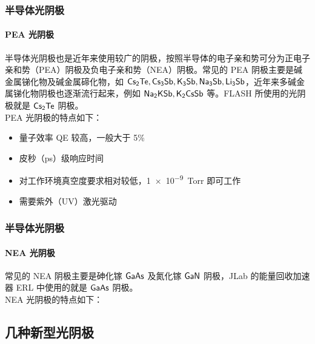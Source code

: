\documentclass[ignorenonframetext, t]{beamer}
\begin{document}
\begin{frame}[label=current]
	\frametitle{半导体光阴极}
	\framesubtitle{PEA 光阴极}
	半导体光阴极也是近年来使用较广的阴极，按照半导体的电子亲和势可分为正电子亲和势（PEA）阴极及负电子亲和势（NEA）阴极。常见的 PEA 阴极主要是碱金属锑化物及碱金属碲化物，如 $\sf Cs_2Te,Cs_3Sb,K_3Sb,Na_3Sb,Li_3Sb$，近年来多碱金属锑化物阴极也逐渐流行起来，例如 $\sf Na_2KSb,K_2CsSb$ 等。FLASH 所使用的光阴极就是 $\sf Cs_2Te$ 阴极。\\[10pt]
	
	PEA 光阴极的特点如下：
	\begin{itemize}
	\item 量子效率 QE 较高，一般大于 5\%
	\item 皮秒（ps）级响应时间
	\item 对工作环境真空度要求相对较低，\SI{1e-9}{Torr} 即可工作
	\item 需要紫外（UV）激光驱动
	\end{itemize}
\end{frame}

\begin{frame}[label=current]
	\frametitle{半导体光阴极}
	\framesubtitle{NEA 光阴极}
	常见的 NEA 阴极主要是砷化镓 $\sf GaAs$ 及氮化镓 $\sf GaN$ 阴极，JLab 的能量回收加速器 ERL 中使用的就是 $\sf GaAs$ 阴极。\\[10pt]
	
	NEA 光阴极的特点如下：
\end{frame}

\subsection{几种新型光阴极}
\end{document}
